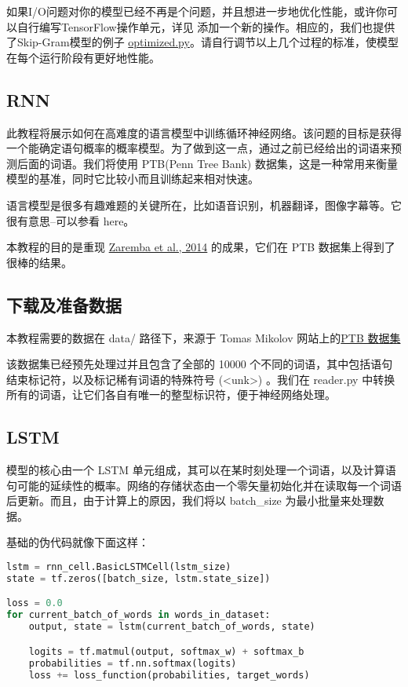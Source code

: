 如果I/O问题对你的模型已经不再是个问题，并且想进一步地优化性能，或许你可以自行编写TensorFlow操作单元，详见 添加一个新的操作。相应的，我们也提供了Skip-Gram模型的例子 \href{https://github.com/bleedingfight/models/tree/master/tutorials/embedding}{optimized.py}。请自行调节以上几个过程的标准，使模型在每个运行阶段有更好地性能。
\subsection{RNN}
此教程将展示如何在高难度的语言模型中训练循环神经网络。该问题的目标是获得一个能确定语句概率的概率模型。为了做到这一点，通过之前已经给出的词语来预测后面的词语。我们将使用 PTB(Penn Tree Bank) 数据集，这是一种常用来衡量模型的基准，同时它比较小而且训练起来相对快速。

语言模型是很多有趣难题的关键所在，比如语音识别，机器翻译，图像字幕等。它很有意思--可以参看 here。

本教程的目的是重现 \href{http://arxiv.org/abs/1409.2329}{Zaremba et al., 2014} 的成果，它们在 PTB 数据集上得到了很棒的结果。
\subsection{下载及准备数据}
本教程需要的数据在 data/ 路径下，来源于 Tomas Mikolov 网站上的\href{http://www.fit.vutbr.cz/~imikolov/rnnlm/simple-examples.tg}{PTB 数据集}

该数据集已经预先处理过并且包含了全部的 10000 个不同的词语，其中包括语句结束标记符，以及标记稀有词语的特殊符号 (<unk>) 。我们在 reader.py 中转换所有的词语，让它们各自有唯一的整型标识符，便于神经网络处理。
\subsection{LSTM}
模型的核心由一个 LSTM 单元组成，其可以在某时刻处理一个词语，以及计算语句可能的延续性的概率。网络的存储状态由一个零矢量初始化并在读取每一个词语后更新。而且，由于计算上的原因，我们将以 batch\_size 为最小批量来处理数据。

基础的伪代码就像下面这样：
\begin{lstlisting}[language=Python]
lstm = rnn_cell.BasicLSTMCell(lstm_size)
state = tf.zeros([batch_size, lstm.state_size])

loss = 0.0
for current_batch_of_words in words_in_dataset:
    output, state = lstm(current_batch_of_words, state)

    logits = tf.matmul(output, softmax_w) + softmax_b
    probabilities = tf.nn.softmax(logits)
    loss += loss_function(probabilities, target_words)
\end{lstlisting}
